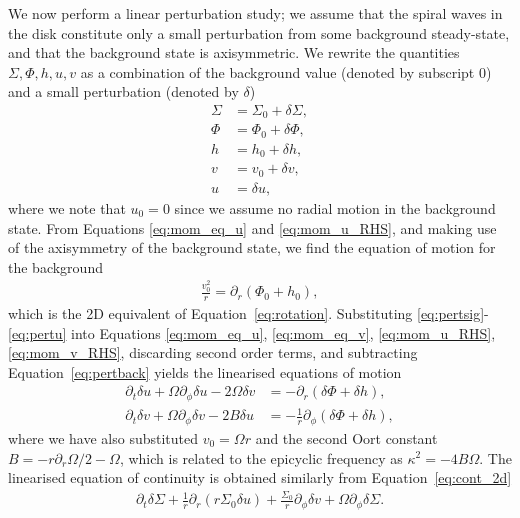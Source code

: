 We now perform a linear perturbation study; we assume that the spiral waves in the disk constitute only a small perturbation from some background steady-state, and that the background state is axisymmetric.
We rewrite the quantities $\Sigma,\Phi,h,u,v$ as a combination of the background value (denoted by subscript 0) and a small perturbation  (denoted by $\delta$)
\begin{align}
    \Sigma &= \Sigma_0 + \delta\Sigma, \label{eq:pertsig} \\
    \Phi &= \Phi_0 + \delta\Phi, \label{eq:pertphi} \\
    h &= h_0 + \delta h, \label{eq:perth} \\
    v &= v_0 + \delta v, \label{eq:pertv} \\ 
    u &= \delta u, \label{eq:pertu}
\end{align}
where we note that $u_0=0$ since we assume no radial motion in the background state.
From Equations \eqref{eq:mom_eq_u} and \eqref{eq:mom_u_RHS}, and making use of the axisymmetry of the background state, we find the equation of motion for the background
\begin{align}
    \frac{v_0^2}{r} = \partial_r \left( \Phi_0 + h_0  \right), \label{eq:pertback}
\end{align}
which is the 2D equivalent of Equation~\eqref{eq:rotation}. 
Substituting \eqref{eq:pertsig}-\eqref{eq:pertu} into Equations \eqref{eq:mom_eq_u}, \eqref{eq:mom_eq_v}, \eqref{eq:mom_u_RHS}, \eqref{eq:mom_v_RHS}, discarding second order terms, and subtracting Equation~\eqref{eq:pertback} yields the linearised equations of motion 
\begin{align}
    \partial_t \delta u + \Omega \partial_\phi \delta u - 2 \Omega \delta v &= - \partial_r \left( \delta \Phi + \delta h  \right), \label{eq:mom_u_lin} \\
    \partial_t \delta v + \Omega \partial_\phi \delta v - 2 B \delta u &= - \frac{1}{r} \partial_\phi \left( \delta \Phi + \delta h  \right), \label{eq:mom_v_lin}
\end{align}
where we have also substituted $v_0=\Omega r$ and the second Oort constant $B = -r \partial_r \Omega / 2 -\Omega$, which is related to the epicyclic frequency as $\kappa^2 = -4 B \Omega$. 
The linearised equation of continuity is obtained similarly from Equation~\eqref{eq:cont_2d}
\begin{align}
    \partial_t \delta \Sigma + \frac{1}{r} \partial_r \left( r \Sigma_0 \delta u  \right) + \frac{\Sigma_0}{r} \partial_\phi \delta v + \Omega \partial_\phi \delta \Sigma. \label{eq:cont_lin}
\end{align}
